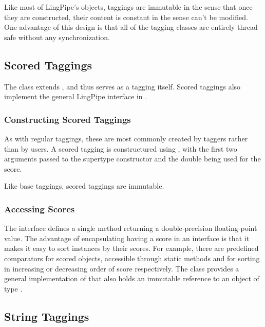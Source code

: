 Like most of LingPipe's objects, taggings are immutable in the sense
that once they are constructed, their content is constant in the sense
can't be modified.  One advantage of this design is that all of
the tagging classes are entirely thread safe without any synchronization.


\subsection{Scored Taggings}\label{section:tagging-scored-tagging}

The class  extends , and thus
serves as a tagging itself.  Scored taggings also implement the
general LingPipe interface  in .

\subsubsection{Constructing Scored Taggings}

As with regular taggings, these are most commonly created by taggers
rather than by users.  A scored tagging is constructured using
, with the first two
arguments passed to the supertype constructor
 and the double being used for the
score.

Like base taggings, scored taggings are immutable. 

\subsubsection{Accessing Scores}

The  interface defines a single method 
returning a double-precision floating-point value.  The advantage of
encapsulating having a score in an interface is that it makes it
easy to sort  instances by their scores.  For example,
there are predefined comparators for scored objects, accessible
through static methods  and
 for sorting in increasing or
decreasing order of score respectively.  The class 
provides a general implementation of  that also holds
an immutable reference to an object of type .


\subsection{String Taggings}


